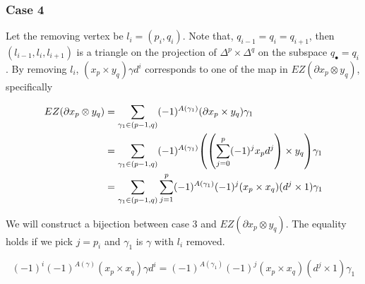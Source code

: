 \documentclass{article}
\begin{document}
\begin{center}
\end{center}

\subsubsection{Case 4}

Let the removing vertex be $l_i = (p_i, q_i)$. Note that, $q_{i-1} = q_i = q_{i+1}$, then $(l_{i-1}, l_i, l_{i+1})$ is a triangle on the projection of $\Delta^p \times \Delta^q$ on the subspace $q_\bullet = q_i$. By removing $l_i$, $(x_p \times y_q) \gamma d^i$ corresponds to one of the map in $EZ(\partial x_p \otimes y_q)$, specifically

\begin{align*}
    EZ(\partial x_p \otimes y_q)
    &= \sum_{\gamma_1 \in (p-1, q)} (-1)^{A(\gamma_1)} (\partial x_p \times y_q) \gamma_1 \\
    &= \sum_{\gamma_1 \in (p-1, q)} (-1)^{A(\gamma_1)} \tuple*{\tuple*{\sum_{j=0}^p (-1)^j x_p d^j} \times y_q} \gamma_1 \\
    &= \sum_{\gamma_1 \in (p-1, q)} \sum_{j=1}^p (-1)^{A(\gamma_1)} (-1)^j (x_p \times x_q) (d^j \times 1) \gamma_1
\end{align*}

\begin{center}
\end{center}

We will construct a bijection between case 3 and $EZ(\partial x_p \otimes y_q)$. The equality holds if we pick $j = p_i$ and $\gamma_1$ is $\gamma$ with $l_i$ removed.

$$
    (-1)^i (-1)^{A(\gamma)} (x_p \times x_q) \gamma d^i = (-1)^{A(\gamma_1)} (-1)^j (x_p \times x_q) (d^j \times 1) \gamma_1
$$
\end{document}
